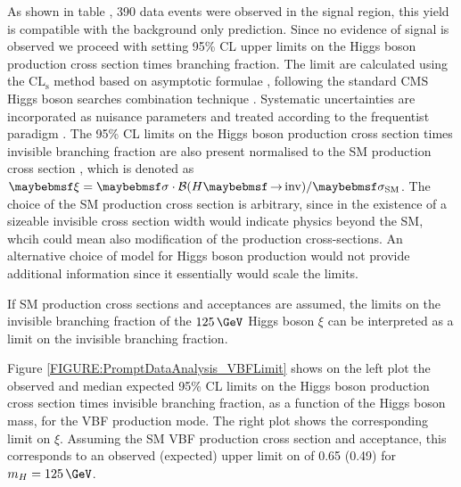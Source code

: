 
As shown in table \cite{ARTICLE:CMSVBFHiggsToInvAndZHCombination}, 390 data events were observed in the signal region, this yield is compatible with the background only prediction. Since no evidence of signal is observed we proceed with setting 95\% \gls{CL} upper limits on the Higgs boson production cross section times branching fraction. The limit are calculated using the $\mathrm{CL}_\mathrm{s}$ method \cite{ARTICLE:HandbookofLHCHiggsCrossSectionsDifferentialDistributions,ARTICLE:CLsTechnique,ARTICLE:CLCompForCombiningSearchesWithSmallStat} based on asymptotic formulae \cite{ARTICLE:AsymptoticCLS}, following the standard CMS Higgs boson searches combination technique \cite{ARTICLE:CMS_HiggsDiscovery,ARTICLE:HiggsCombination}. Systematic uncertainties are incorporated as nuisance parameters and treated according to the frequentist paradigm \cite{ARTICLE:HiggsCombination}. The 95\% \gls{CL} limits on the Higgs boson production  cross section times invisible branching fraction are also present normalised to the \gls{SM} production cross section \cite{ARTICLE:HandbookofLHCHiggsCrossSectionsInclusiveObservables,ARTICLE:HandbookofLHCHiggsCrossSectionsDifferentialDistributions}, which is denoted as $\xi = \sigma \cdot \BRinv / \sigma_\mathrm{SM}$. The choice of the \gls{SM} production cross section is arbitrary, since in the existence of a sizeable invisible cross section width would indicate physics beyond the \gls{SM}, whcih could mean also modification of the production cross-sections. An alternative choice of model for Higgs boson production would not provide additional information since it essentially would scale the limits.

If \gls{SM} production cross sections and acceptances are assumed, the limits on the invisible branching fraction of the $125\,\GeV$ Higgs boson $\xi$ can be interpreted as a limit on the invisible branching fraction.

Figure \ref{FIGURE:PromptDataAnalysis_VBFLimit} shows on the left plot the observed and median expected 95\% \gls{CL} limits on the Higgs boson production cross section times invisible branching fraction, as a function of the Higgs boson mass, for the \gls{VBF} production mode. The right plot shows the corresponding limit on $\xi$.  Assuming the \gls{SM} \gls{VBF} production cross section and acceptance, this corresponds to an observed (expected) upper limit on \BRinv of 0.65 (0.49) for $m_H=125\,\GeV$.

